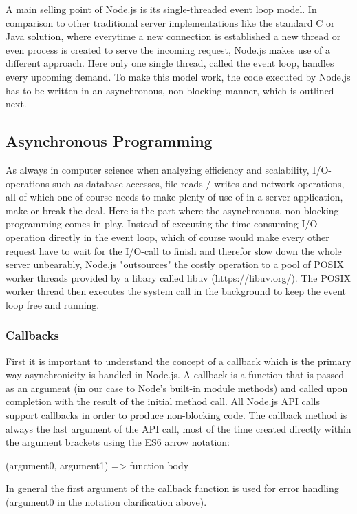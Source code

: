 \documentclass{bioinfo}
\begin{document}
A main selling point of Node.js is its single-threaded event loop model. In comparison to other traditional server implementations like the standard C or Java solution, where everytime a new connection is established a new thread or even process is created to serve the incoming request, Node.js makes use of a different approach. Here only one single thread, called the event loop, handles every upcoming demand. To make this model work, the code executed by Node.js has to be written in an asynchronous, non-blocking manner, which is outlined next.

\subsection{Asynchronous Programming}
As always in computer science when analyzing efficiency and scalability, I/O-operations such as database accesses, file reads / writes and network operations, all of which one of course needs to make plenty of use of in a server application, make or break the deal. Here is the part where the asynchronous, non-blocking programming comes in play. Instead of executing the time consuming I/O-operation directly in the event loop, which of course would make every other request have to wait for the I/O-call to finish and therefor slow down the whole server unbearably, Node.js "outsources" the costly operation to a pool of POSIX worker threads provided by a libary called libuv (https://libuv.org/). The POSIX worker thread then executes the system call in the background to keep the event loop free and running.

\subsubsection{Callbacks}
First it is important to understand the concept of a callback which is the primary way asynchronicity is handled in Node.js. A callback is a function that is passed as an argument (in our case to Node's built-in module methods) and called upon completion with the result of the initial method call. All Node.js API calls support callbacks in order to produce non-blocking code. The callback method is always the last argument of the API call, most of the time created directly within the argument brackets using the ES6 arrow notation: 
\begin{verbatim*}
(argument0, argument1) => {function body}
\end{verbatim*}
In general the first argument of the callback function is used for error handling (argument0 in the notation clarification above).
\end{document}

